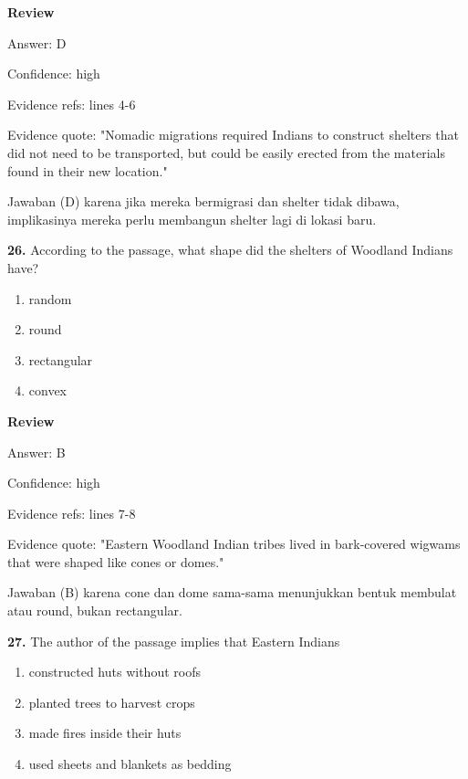 \documentclass[12pt]{article}
\begin{document}
\par
\begingroup
\setlength{\parskip}{0pt}
\setlength{\parindent}{0pt}
\textbf{Review}\par
Answer: D\par
Confidence: high\par
Evidence refs: lines 4-6\par
Evidence quote: "Nomadic migrations required Indians to construct shelters that did not need to be transported, but could be easily erected from the materials found in their new location."\par
Jawaban (D) karena jika mereka bermigrasi dan shelter tidak dibawa, implikasinya mereka perlu membangun shelter lagi di lokasi baru.\par
\endgroup
\par
\vspace{0.25\baselineskip}
\noindent\textbf{26.} According to the passage, what shape did the shelters of Woodland Indians have?
\begin{enumerate}[label=(\Alph*),leftmargin=*,itemsep=0.2em]
\item random
\item round
\item rectangular
\item convex
\end{enumerate}
\par
\begingroup
\setlength{\parskip}{0pt}
\setlength{\parindent}{0pt}
\textbf{Review}\par
Answer: B\par
Confidence: high\par
Evidence refs: lines 7-8\par
Evidence quote: "Eastern Woodland Indian tribes lived in bark-covered wigwams that were shaped like cones or domes."\par
Jawaban (B) karena cone dan dome sama-sama menunjukkan bentuk membulat atau round, bukan rectangular.\par
\endgroup
\par
\vspace{0.25\baselineskip}
\noindent\textbf{27.} The author of the passage implies that Eastern Indians
\begin{enumerate}[label=(\Alph*),leftmargin=*,itemsep=0.2em]
\item constructed huts without roofs
\item planted trees to harvest crops
\item made fires inside their huts
\item used sheets and blankets as bedding
\end{enumerate}
\end{document}

